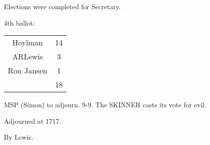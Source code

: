 \documentclass[12pt]{article}
\begin{document}
Elections were completed for Secretary.

4th ballot:

\begin{center}
\begin{tabular}{ c c } 
 Hoylman & 14 \\
 ARLewis & 3 \\
 Ron Jansen & 1 \\
  & 18 \\ 
\end{tabular}
\end{center}

MSP (Simon) to adjourn. 9-9. The SKINNER casts its vote for evil.

Adjourned at 1717.

\vspace{12pt}

\centerline{By Lewis.}
\end{document}
